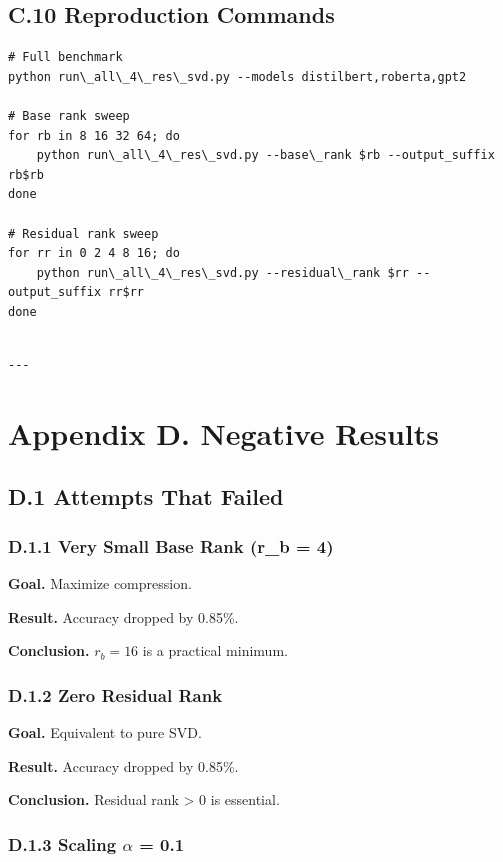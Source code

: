 \subsection{C.10 Reproduction Commands}

\begin{lstlisting}
# Full benchmark
python run\_all\_4\_res\_svd.py --models distilbert,roberta,gpt2

# Base rank sweep
for rb in 8 16 32 64; do
    python run\_all\_4\_res\_svd.py --base\_rank $rb --output_suffix rb$rb
done

# Residual rank sweep
for rr in 0 2 4 8 16; do
    python run\_all\_4\_res\_svd.py --residual\_rank $rr --output_suffix rr$rr
done
\end{lstlisting}
\begin{lstlisting}

---
\end{lstlisting}

\section{Appendix D. Negative Results}

\subsection{D.1 Attempts That Failed}

\subsubsection{D.1.1 Very Small Base Rank (r\_b = 4)}

\textbf{Goal.} Maximize compression.

\textbf{Result.} Accuracy dropped by 0.85\%.

\textbf{Conclusion.} $r_b = 16$ is a practical minimum.

\subsubsection{D.1.2 Zero Residual Rank}

\textbf{Goal.} Equivalent to pure SVD.

\textbf{Result.} Accuracy dropped by 0.85\%.

\textbf{Conclusion.} Residual rank \textgreater{} 0 is essential.

\subsubsection{D.1.3 Scaling $\alpha$ = 0.1}

